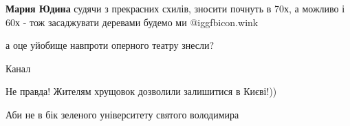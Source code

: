 \begin{itemize}
\textbf{Мария Юдина} судячи з прекрасних схилів, зносити почнуть в 70х, а можливо і 60х - тож засаджувати деревами будемо ми  @igg{fbicon.wink} 

 
а оце уйобище навпроти оперного театру знесли?

 
Канал

 
Не правда! Жителям хрущовок дозволили залишитися в Києві!))

 
Аби не в бік зеленого університету святого володимира

\end{itemize}

